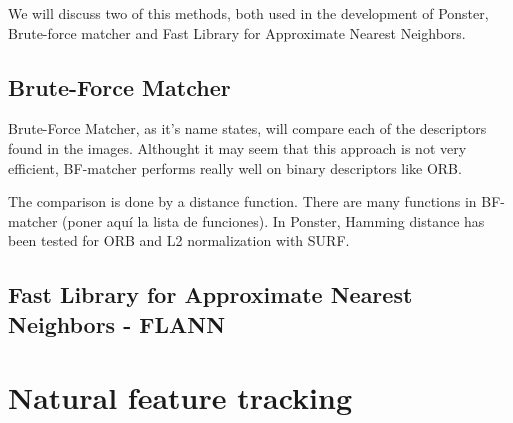 We will discuss two of this methods, both used in the development of Ponster,
Brute-force matcher and Fast Library for Approximate Nearest Neighbors. 

\subsection{Brute-Force Matcher}
Brute-Force Matcher, as it's name states, will compare each of the descriptors
found in the images. Althought it may seem that this approach is not very
efficient, BF-matcher performs really well on binary descriptors like ORB.

The comparison is done by a distance function. There are many functions in
BF-matcher (poner aquí la lista de funciones). In Ponster, Hamming distance has
been tested for ORB and L2 normalization with SURF.

\subsection{Fast Library for Approximate Nearest Neighbors - FLANN}

\section{Natural feature tracking}

